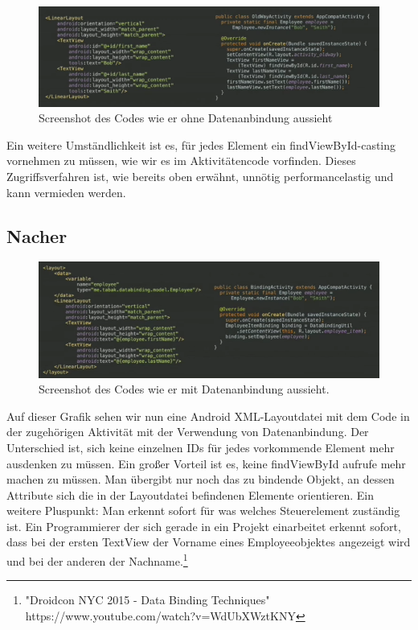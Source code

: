 \documentclass[FIPLY_base.tex]{subfiles}
\begin{document}
\begin{figure}[h]
\centering
\includegraphics[scale=0.45]{Bilder/DataBinding_vorher}
\caption{Screenshot des Codes wie er ohne Datenanbindung aussieht}
\end{figure}

Ein weitere Umständlichkeit ist es, für jedes Element ein findViewById-casting vornehmen zu müssen, wie wir es im Aktivitätencode vorfinden. Dieses Zugriffsverfahren ist, wie bereits oben erwähnt, unnötig performancelastig und kann vermieden werden.
\subsection{Nacher}

\begin{figure}[h]
\centering
\includegraphics[scale=0.45]{Bilder/DataBinding_nacher}
\caption{Screenshot des Codes wie er mit Datenanbindung aussieht.}
\end{figure}

Auf dieser Grafik sehen wir nun eine Android XML-Layoutdatei mit dem Code in der zugehörigen Aktivität mit der Verwendung von Datenanbindung. Der Unterschied ist, sich keine einzelnen IDs für jedes vorkommende Element mehr ausdenken zu müssen. Ein großer Vorteil ist es, keine findViewById aufrufe mehr machen zu müssen. Man übergibt nur noch das zu bindende Objekt, an dessen Attribute sich die in der Layoutdatei befindenen Elemente orientieren. 
Ein weitere Pluspunkt: Man erkennt sofort für was welches Steuerelement zuständig ist. Ein Programmierer der sich gerade in ein Projekt einarbeitet erkennt sofort, dass bei der ersten TextView der Vorname eines Employeeobjektes angezeigt wird und bei der anderen der Nachname.\footnote{"Droidcon NYC 2015 - Data Binding Techniques" \\ https://www.youtube.com/watch?v=WdUbXWztKNY}
\end{document}
